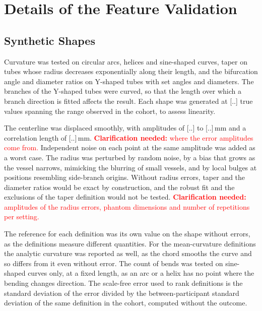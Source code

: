 \providecommand{\clarify}[1]{\textcolor{red}{\textbf{Clarification needed:} #1}}
\section{Details of the Feature Validation}
\label{sec:app-validity}

\subsection{Synthetic Shapes}
\label{sec:app-validity-phantoms}

Curvature was tested on circular arcs, helices and sine-shaped curves, taper on tubes whose radius decreases exponentially along their length, and the bifurcation angle and diameter ratios on Y-shaped tubes with set angles and diameters.
The branches of the Y-shaped tubes were curved, so that the length over which a branch direction is fitted affects the result.
Each shape was generated at [..] true values spanning the range observed in the cohort, to assess linearity.

The centerline was displaced smoothly, with amplitudes of [..] to [..]\,mm and a correlation length of [..]\,mm.
\clarify{where the error amplitudes come from.}
Independent noise on each point at the same amplitude was added as a worst case.
The radius was perturbed by random noise, by a bias that grows as the vessel narrows, mimicking the blurring of small vessels, and by local bulges at positions resembling side-branch origins.
Without radius errors, taper and the diameter ratios would be exact by construction, and the robust fit and the exclusions of the taper definition would not be tested.
\clarify{amplitudes of the radius errors, phantom dimensions and number of repetitions per setting.}

The reference for each definition was its own value on the shape without errors, as the definitions measure different quantities.
For the mean-curvature definitions the analytic curvature was reported as well, as the chord smooths the curve and so differs from it even without error.
The count of bends was tested on sine-shaped curves only, at a fixed length, as an arc or a helix has no point where the bending changes direction.
The scale-free error used to rank definitions is the standard deviation of the error divided by the between-participant standard deviation of the same definition in the cohort, computed without the outcome.

